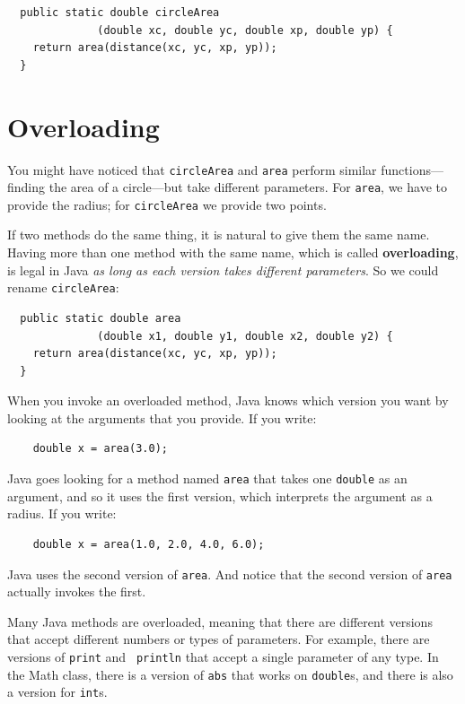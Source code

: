 \begin{lstlisting}
  public static double circleArea
              (double xc, double yc, double xp, double yp) {
    return area(distance(xc, yc, xp, yp));
  }
\end{lstlisting}


\section{Overloading}
\label{overloading}

You might have noticed that {\tt circleArea}
and {\tt area} perform similar functions---finding
the area of a circle---but take different parameters.  For
{\tt area}, we have to provide the radius; for {\tt circleArea}
we provide two points.

If two methods do the same thing, it is natural to give them
the same name.
Having more than one method with the same name, which is called {\bf
overloading}, is legal in Java {\em as long as each version takes
different parameters}.  So we could rename {\tt circleArea}:

\begin{lstlisting}
  public static double area
              (double x1, double y1, double x2, double y2) {
    return area(distance(xc, yc, xp, yp));
  }
\end{lstlisting}
%
When you invoke an overloaded method, Java knows which version you
want by looking at the arguments that you provide.  If you write:

\begin{lstlisting}
    double x = area(3.0);
\end{lstlisting}
%
Java goes looking for a method named {\tt area} that
takes one {\tt double} as an argument, and so it uses the
first version, which interprets the argument as a radius.
If you write:

\begin{lstlisting}
    double x = area(1.0, 2.0, 4.0, 6.0);
\end{lstlisting}
%
Java uses the second version of {\tt area}.  And notice that the
second version of {\tt area} actually invokes the first.

Many Java methods are overloaded, meaning that there
are different versions that accept different numbers or types of
parameters.  For example, there are versions of {\tt print} and {\tt
println} that accept a single parameter of any type.  In the Math
class, there is a version of {\tt abs} that works on {\tt double}s,
and there is also a version for {\tt int}s.

